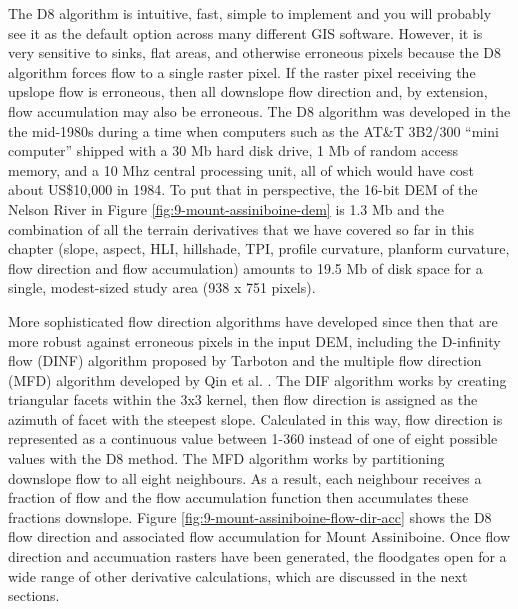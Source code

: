 \documentclass[
]{book}
\begin{document}
The D8 algorithm is intuitive, fast, simple to implement and you will probably see it as the default option across many different GIS software. However, it is very sensitive to sinks, flat areas, and otherwise erroneous pixels because the D8 algorithm forces flow to a single raster pixel. If the raster pixel receiving the upslope flow is erroneous, then all downslope flow direction and, by extension, flow accumulation may also be erroneous. The D8 algorithm was developed in the the mid-1980s during a time when computers such as the AT\&T 3B2/300 ``mini computer'' shipped with a 30 Mb hard disk drive, 1 Mb of random access memory, and a 10 Mhz central processing unit, all of which would have cost about US\$10,000 in 1984. To put that in perspective, the 16-bit DEM of the Nelson River in Figure \ref{fig:9-mount-assiniboine-dem} is 1.3 Mb and the combination of all the terrain derivatives that we have covered so far in this chapter (slope, aspect, HLI, hillshade, TPI, profile curvature, planform curvature, flow direction and flow accumulation) amounts to 19.5 Mb of disk space for a single, modest-sized study area (938 x 751 pixels).

More sophisticated flow direction algorithms have developed since then that are more robust against erroneous pixels in the input DEM, including the D-infinity flow (DINF) algorithm proposed by Tarboton \citep{tarboton_new_1997} and the multiple flow direction (MFD) algorithm developed by Qin et al. \citep{qin_adaptive_2007}. The DIF algorithm works by creating triangular facets within the 3x3 kernel, then flow direction is assigned as the azimuth of facet with the steepest slope. Calculated in this way, flow direction is represented as a continuous value between 1-360 instead of one of eight possible values with the D8 method. The MFD algorithm works by partitioning downslope flow to all eight neighbours. As a result, each neighbour receives a fraction of flow and the flow accumulation function then accumulates these fractions downslope. Figure \ref{fig:9-mount-assiniboine-flow-dir-acc} shows the D8 flow direction and associated flow accumulation for Mount Assiniboine. Once flow direction and accumuation rasters have been generated, the floodgates open for a wide range of other derivative calculations, which are discussed in the next sections.
\end{document}
